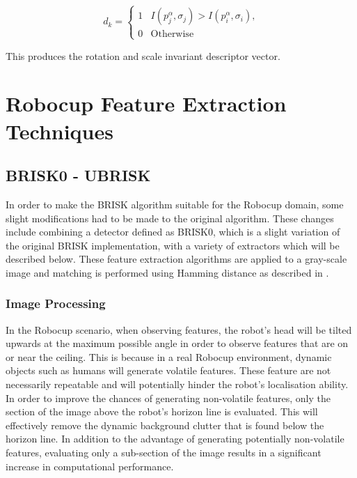\documentclass{article}
\begin{document}
\begin{equation}
d_k = \left\{ \begin{array}{rl}
1 &\mbox{$I(p_j^{\alpha}, \sigma_j) > I(p_i^{\alpha}, \sigma_i)$,} \\
0 &\mbox{Otherwise}
\end{array} \right.
\label{eqn:brightness}
\end{equation}

This produces the rotation and scale invariant descriptor vector.\\ 

\section{Robocup Feature Extraction Techniques}
\label{sec:realtimeFeatureExtraction}

\subsection{BRISK0 - UBRISK}
\label{sec:brisk0}
In order to make the BRISK algorithm suitable for the Robocup domain, some slight modifications had to be made to the original algorithm. These changes include combining a detector defined as BRISK0, which is a slight variation of the original BRISK implementation, with a variety of extractors which will be described below. These feature extraction algorithms are applied to a gray-scale image and matching is performed using Hamming distance as described in .\\

\subsubsection{Image Processing}
\label{sec:imageProcessingBrisk}
In the Robocup scenario, when observing features, the robot's head will be tilted upwards at the maximum possible angle in order to observe features that are on or near the ceiling. This is because in a real Robocup environment, dynamic objects such as humans will generate volatile features. These feature are not necessarily repeatable and will potentially hinder the robot's localisation ability.\\

In order to improve the chances of generating non-volatile features, only the section of the image above the robot's horizon line is evaluated. This will effectively remove the dynamic background clutter that is found below the horizon line. In addition to the advantage of generating potentially non-volatile features, evaluating only a sub-section of the image results in a significant increase in computational performance. \\ 
\end{document}

